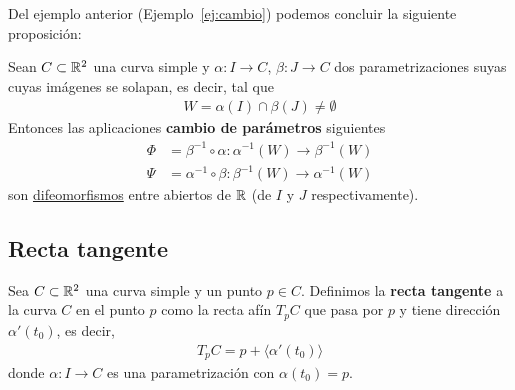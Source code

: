 

Del ejemplo anterior (Ejemplo~\ref{ej:cambio}) podemos concluir la siguiente proposición:\\
\begin{prop}\label{prop:cambio}
    Sean $C\subset \mathbb{R}^2$ una curva simple y $\alpha:I \to C$, $\beta: J \to C$ dos parametrizaciones suyas cuyas imágenes se solapan, es decir, tal que 
    \begin{gather*}
        W = \alpha(I)\cap \beta(J) \neq \emptyset
    \end{gather*}
    Entonces las aplicaciones \textbf{cambio de parámetros} siguientes
    \begin{align*}
        \Phi &= \beta^{-1}\circ \alpha : \alpha^{-1}(W) \to \beta^{-1}(W)\\
        \Psi &= \alpha^{-1}\circ \beta : \beta^{-1}(W) \to \alpha^{-1}(W)
    \end{align*}
    son \underline{difeomorfismos} entre abiertos de $\mathbb{R}$ (de $I$ y $J$ respectivamente).
\end{prop}

\subsection{Recta tangente}

\begin{definicion}
    Sea $C\subset \mathbb{R}^2$ una curva simple y un punto $p\in C$. Definimos la \textbf{recta tangente} a la curva $C$ en el punto $p$ como la recta afín $T_pC$ que pasa por $p$ y tiene dirección $\alpha'(t_0)$, es decir,
    \begin{gather*}
        T_pC = p + \langle \alpha'(t_0) \rangle
    \end{gather*}
    donde $\alpha: I \to C$ es una parametrización con $\alpha(t_0)=p$.
\end{definicion}

